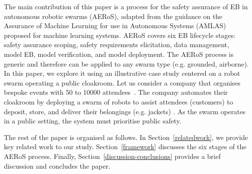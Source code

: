 \documentclass[runningheads]{llncs}
\begin{document}
The main contribution of this paper is a process for the safety assurance of EB in autonomous robotic swarms (AERoS), adapted from the guidance on the Assurance of Machine Learning for use in Autonomous Systems (AMLAS)~\cite{Hawkins2021} proposed for machine learning systems. 
AERoS covers six EB lifecycle stages: safety assurance scoping, safety requirements elicitation, data management, model EB, model verification, and model deployment. 
The AERoS process is generic and therefore can be applied to any swarm type (e.g. grounded, airborne). 
In this paper, we explore it using an illustrative case study centered on a robot swarm operating a public cloakroom. 
Let us consider a company that organises bespoke events with 50 to 10000 attendees~\cite{Jones2020}. 
The company automates their cloakroom by deploying a swarm of robots to assist attendees (customers) to deposit, store, and deliver their belongings (e.g. jackets) \cite{Jones2020}. 
As the swarm operates in a public setting, the system must prioritise public safety. 

The rest of the paper is organised as follows. 
In Section~\ref{relatedwork}, we provide key related work to our study. Section~\ref{framework} discusses the six stages of the AERoS process. Finally, Section~\ref{discussion-conclusions} provides a brief discussion and concludes the paper. 

\end{document}
